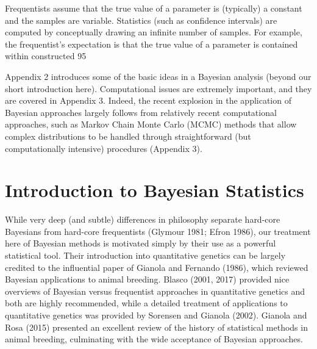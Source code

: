 \documentclass{article}
\begin{document}
Frequentists assume that the true value of a parameter is (typically) a constant and the samples are variable. Statistics (such as confidence intervals) are computed by conceptually drawing an infinite number of samples. For example, the frequentist's expectation is that the true value of a parameter is contained within constructed 95%

Appendix 2 introduces some of the basic ideas in a Bayesian analysis (beyond our short introduction here). Computational issues are extremely important, and they are covered in Appendix 3. Indeed, the recent explosion in the application of Bayesian approaches largely follows from relatively recent computational approaches, such as Markov Chain Monte Carlo (MCMC) methods that allow complex distributions to be handled through straightforward (but computationally intensive) procedures (Appendix 3).

\section{Introduction to Bayesian Statistics}
While very deep (and subtle) differences in philosophy separate hard-core Bayesians from hard-core frequentists (Glymour 1981; Efron 1986), our treatment here of Bayesian methods is motivated simply by their use as a powerful statistical tool. Their introduction into quantitative genetics can be largely credited to the influential paper of Gianola and Fernando (1986), which reviewed Bayesian applications to animal breeding. Blasco (2001, 2017) provided nice overviews of Bayesian versus frequentist approaches in quantitative genetics and both are highly recommended, while a detailed treatment of applications to quantitative genetics was provided by Sorensen and Gianola (2002). Gianola and Rosa (2015) presented an excellent review of the history of statistical methods in animal breeding, culminating with the wide acceptance of Bayesian approaches.
\end{document}
